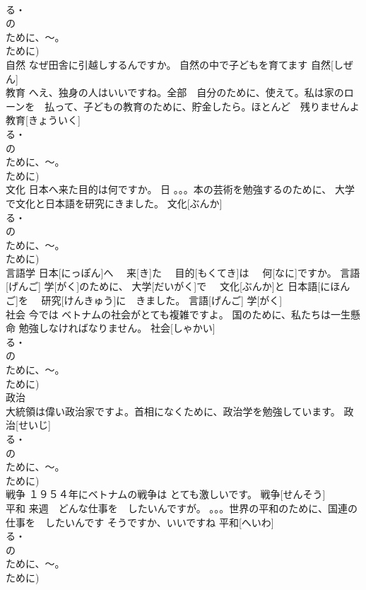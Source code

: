 \documentclass[8pt]{extreport}
\begin{document}
\begin{CJK}{UTF8}{min}
\\	る・
\\	の　
\\	ために、～。
\\	ために)
\\	自然	なぜ田舎に引越しするんですか。 自然の中で子どもを育てます	自然[しぜん]					
\\	教育	へえ、独身の人はいいですね。全部　自分のために、使えて。私は家のローンを　払って、子どもの教育のために、貯金したら。ほとんど　残りませんよ	教育[きょういく]			
\\	る・
\\	の　
\\	ために、～。
\\	ために)
\\	文化	日本へ来た目的は何ですか。 日 。。。本の芸術を勉強するのために、 大学で文化と日本語を研究にきました。	文化[ぶんか]			
\\	る・
\\	の　
\\	ために、～。
\\	ために)
\\	言語学	日本[にっぽん]へ　 来[き]た　 目的[もくてき]は　 何[なに]ですか。 言語[げんご] 学[がく]のために、 大学[だいがく]で　 文化[ぶんか]と 日本語[にほんご]を　 研究[けんきゅう]に　きました。	言語[げんご] 学[がく]					
\\	社会	今では ベトナムの社会がとても複雑ですよ。 国のために、私たちは一生懸命 勉強しなければなりません。	社会[しゃかい]			
\\	る・
\\	の　
\\	ために、～。
\\	ために)
\\	政治	
\\	大統領は偉い政治家ですよ。首相になくために、政治学を勉強しています。	政治[せいじ]				
\\	る・
\\	の　
\\	ために、～。
\\	ために)
\\	戦争	１９５４年にベトナムの戦争は とても激しいです。	戦争[せんそう]			
\\	平和	来週　どんな仕事を　したいんですが。 。。。世界の平和のために、国連の仕事を　したいんです そうですか、いいですね	平和[へいわ]			
\\	る・
\\	の　
\\	ために、～。
\\	ために)

\end{CJK}
\end{document}
